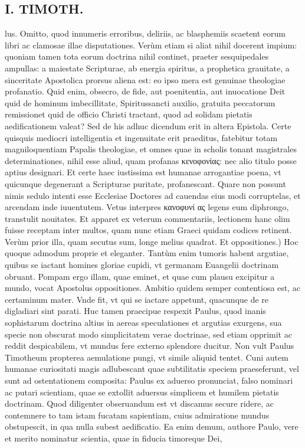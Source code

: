 \documentclass{article}
\begin{document}
\begin{pages}
\section*{I. TIMOTH. }
\marginpar{[ p.86 ]}\pstart lus. Omitto, quod innumeris erroribus, deliriis, ac blasphemiis scaetent eorum libri ac clamosae illae disputationes. Verùm etiam si aliat nihil docerent impium: quoniam tamen tota eorum doctrina nihil continet, praeter sesquipedales ampullas: a maiestate Scripturae, ab energia spiritus, a prophetica grauitate, a sinceritate Apostolica prorsus aliena est: eo ipso mera est genuinae theologiae profanatio. Quid enim, obsecro, de fide, aut poenitentia, aut inuocatione Deit quid de hominum imbecillitate, Spiritussancti auxilio, gratuita peccatorum remissionet quid de officio Christi tractant, quod ad solidam pietatis aedificationem valeat? Sed de his adhuc dicendum erit in altera Epistola. Certe quisquis mediocri intelligentia et ingenuitate erit praeditus, fatebitur totam magniloquentiam Papalis theologiae, et omnes quae in scholis tonant magistrales determinationes, nihil esse aliud, quam profanas κενοφονίας: nec alio titulo posse aptius designari. Et certe haec iustissima est humanae arrogantiae poena, vt quicunque degenerant a Scripturae puritate, profanescant. Quare non possunt nimis sedulo intenti esse Ecclesiae Doctores ad cauendas eius modi corruptelas, et arcendam inde iuuentutem. Vetus interpres κανοφυνί ας legens eum diphrongo, transtulit nouitates. Et apparet ex veterum commentariis, lectionem hanc olim fuisse receptam inter multos, quam nunc etiam Graeci quidam codices retinent. Verùm prior illa, quam secutus sum, longe melius quadrat.  \pend\pstart Et oppositiones.) Hoc quoque admodum proprie et eleganter. Tantùm enim tumoris habent argutiae, quibus se iactant homines gloriae cupidi, vt germanam Euangelii doctrinam obruant. Pompam ergo illam, quae eminet, et quae cum plausu excipitur a mundo, vocat Apostolus oppositiones. Ambitio quidem semper contentiosa est, ac certaminum mater. Vnde fit, vt qui se iactare appetunt, quacunque de re digladiari sint parati. Huc tamen praecipue respexit Paulus, quod inanis sophistarum doctrina altius in aereas speculationes et argutias exurgens, sua specie non obscurat modo simplicitatem verae doctrinae, sed etiam opprimit ac reddit despicabilem, vt mundus fere externo splendore ducitur. Non vult Paulus Timotheum propterea aemulatione pungi, vt simile aliquid tentet. Cuni autem humanae curiositati magis adlubescant quae subtilitatis speciem praeseferunt, vel sunt ad ostentationem composita: Paulus ex aduerso pronunciat, falso nominari ac putari scientiam, quae se extollit aduersus simplicem et humilem pietatis doctrinam. Quod diligenter obseruandum est vt discamus secure ridere, ac contemnere to tam istam fucatam sapientiam, cuius admiratione mundus obstupescit, in qua nulla subest aedificatio. Ea enim demum, authore Paulo, vere et merito nominatur scientia, quae in fiducia timoreque Dei,  \pend

\end{pages}
\end{document}
